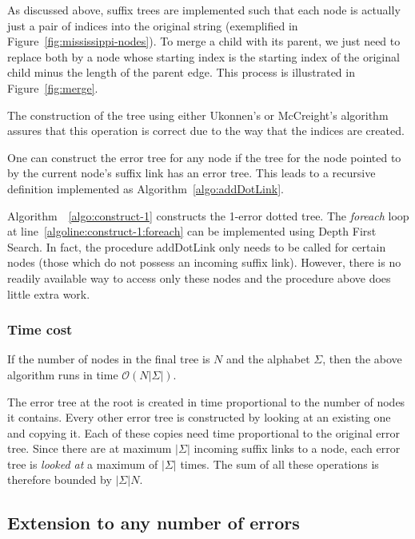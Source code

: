 As discussed above, suffix trees are implemented such that each node is actually just a pair of indices into the original string (exemplified in Figure~\ref{fig:mississippi-nodes}). To merge a child with its parent, we just need to replace both by a node whose starting index is the starting index of the original child minus the length of the parent edge. This process is illustrated in Figure~\ref{fig:merge}.

The construction of the tree using either Ukonnen's or McCreight's algorithm assures that this operation is correct due to the way that the indices are created.



One can construct the error tree for any node if the tree for the node pointed to by the current node's suffix link has an error tree. This leads to a recursive definition implemented as Algorithm~\ref{algo:addDotLink}. 



Algorithm~~\ref{algo:construct-1} constructs the 1-error dotted tree. The \textit{foreach} loop at line~\ref{algoline:construct-1:foreach} can be implemented using Depth First Search. In fact, the procedure addDotLink only needs to be called for certain nodes (those which do not possess an incoming suffix link). However, there is no readily available way to access only these nodes and the procedure above does little extra work.

\subsubsection*{Time cost}

If the number of nodes in the final tree is $N$ and the alphabet $\Sigma$, then the above algorithm runs in time $\mathcal{O}(N|\Sigma|)$.

The error tree at the root is created in time proportional to the number of nodes it contains. Every other error tree is constructed by looking at an existing one and copying it. Each of these copies need time proportional to the original error tree. Since there are at maximum $|\Sigma|$ incoming suffix links to a node, each error tree is \emph{looked at} a maximum of $|\Sigma|$ times. The sum of all these operations is therefore bounded by $|\Sigma|N$.

\subsection{Extension to any number of errors}\label{subsec:construct-k-larger-1}

